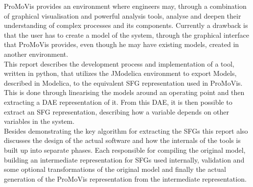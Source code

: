 ProMoVis provides an environment where engineers may, through a combination of graphical visualisation and powerful analysis tools, analyse and deepen their understanding of complex processes and its components. Currently a drawback is that the user has to create a model of the system, through the graphical interface that ProMoVis provides, even though he may have existing models, created in another environment.\\\newline This report describes the development process and implementation of a tool, written in python, that utilizes the JModelica environment to export Models, described in Modelica, to the equivalent SFG representation used in ProMoVis. This is done through linearising the models around an operating point and then extracting a DAE representation of it. From this DAE, it is then possible to extract an SFG representation, describing how a variable depends on other variables in the system.\\\newline Besides demonstrating the key algorithm for extracting the SFGs this report also discusses the design of the actual software and how the internals of the tools is built up into separate phases. Each responsible for compiling the original model, building an intermediate representation for SFGs used internally, validation and some optional transformations of the original model and finally the actual generation of the ProMoVis representation from the intermediate representation. 